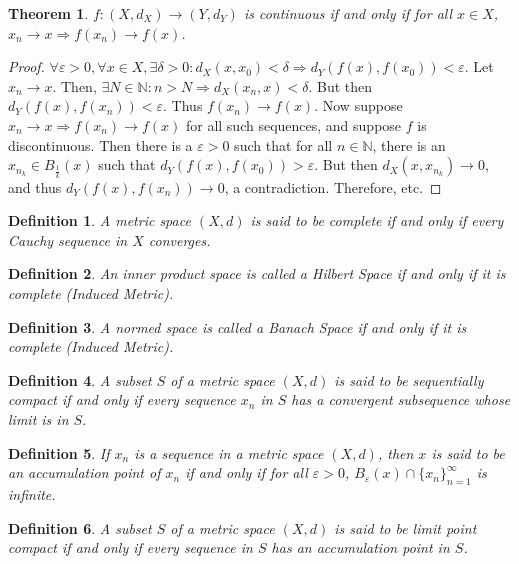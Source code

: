 \documentclass[oneside]{book}
\theoremstyle{mystyle}
\newtheorem{theorem}{Theorem}[section]
\newtheorem{definition}{Definition}[section]
\begin{document}
\begin{theorem}
$f:(X,d_X)\rightarrow (Y,d_Y)$ is continuous if and only if for all $x\in X$, $x_n\rightarrow x \Rightarrow f(x_n)\rightarrow f(x)$.
\end{theorem}
\begin{proof}
$\forall \varepsilon>0,\forall x\in X,\exists \delta>0:d_X(x,x_0)<\delta \Rightarrow d_Y(f(x),f(x_0))<\varepsilon$. Let $x_n \rightarrow x$. Then, $\exists N\in \mathbb{N}:n>N \Rightarrow d_X(x_n,x)<\delta$. But then $d_Y(f(x),f(x_n)) < \varepsilon$. Thus $f(x_n)\rightarrow f(x)$. Now suppose $x_n\rightarrow x \Rightarrow f(x_n)\rightarrow f(x)$ for all such sequences, and suppose $f$ is discontinuous. Then there is a $\varepsilon>0$ such that for all $n\in \mathbb{N}$, there is an $x_{n_k} \in B_{\frac{1}{k}}(x)$ such that $d_Y(f(x),f(x_0))>\varepsilon$. But then $d_X(x,x_{n_k})\rightarrow 0$, and thus $d_Y(f(x),f(x_n))\rightarrow 0$, a contradiction. Therefore, etc.
\end{proof}

\begin{definition}
A metric space $(X,d)$ is said to be complete if and only if every Cauchy sequence in $X$ converges.
\end{definition}

\begin{definition}
An inner product space is called a Hilbert Space if and only if it is complete (Induced Metric).
\end{definition}

\begin{definition}
A normed space is called a Banach Space if and only if it is complete (Induced Metric).
\end{definition}

\begin{definition}
A subset $S$ of a metric space $(X,d)$ is said to be sequentially compact if and only if every sequence $x_n$ in $S$ has a convergent subsequence whose limit is in $S$.
\end{definition}

\begin{definition}
If $x_n$ is a sequence in a metric space $(X,d)$, then $x$ is said to be an accumulation point of $x_n$ if and only if for all $\varepsilon>0$, $B_{\varepsilon}(x)\cap \{x_n\}_{n=1}^{\infty}$ is infinite.
\end{definition}

\begin{definition}
A subset $S$ of a metric space $(X,d)$ is said to be limit point compact if and only if every sequence in $S$ has an accumulation point in $S$.
\end{definition}
\end{document}
